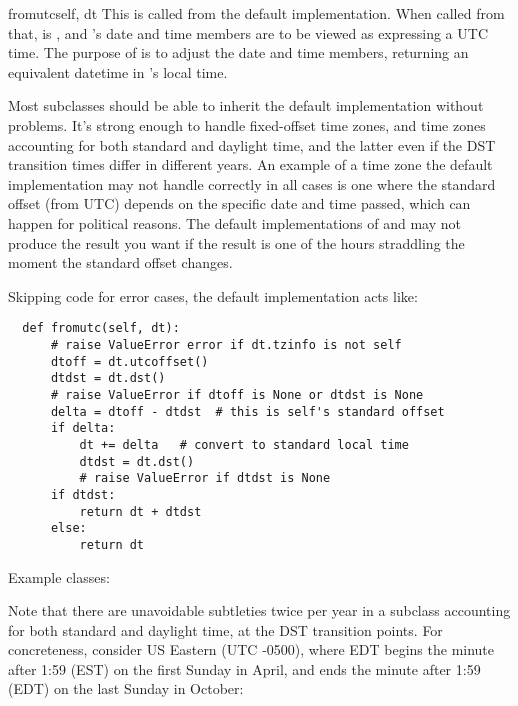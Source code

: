 \begin{methoddesc}[tzinfo]{fromutc}{self, dt}
  This is called from the default 
  implementation.  When called from that,  is
  , and 's date and time members are to be viewed as
  expressing a UTC time.  The purpose of  is to
  adjust the date and time members, returning an equivalent datetime in
  's local time.

  Most  subclasses should be able to inherit the default
   implementation without problems.  It's strong enough
  to handle fixed-offset time zones, and time zones accounting for both
  standard and daylight time, and the latter even if the DST transition
  times differ in different years.  An example of a time zone the default
   implementation may not handle correctly in all cases
  is one where the standard offset (from UTC) depends on the specific date
  and time passed, which can happen for political reasons.
  The default implementations of  and
   may not produce the result you want if the result is
  one of the hours straddling the moment the standard offset changes.

  Skipping code for error cases, the default 
  implementation acts like:

  \begin{verbatim}
  def fromutc(self, dt):
      # raise ValueError error if dt.tzinfo is not self
      dtoff = dt.utcoffset()
      dtdst = dt.dst()
      # raise ValueError if dtoff is None or dtdst is None
      delta = dtoff - dtdst  # this is self's standard offset
      if delta:
          dt += delta   # convert to standard local time
          dtdst = dt.dst()
          # raise ValueError if dtdst is None
      if dtdst:
          return dt + dtdst
      else:
          return dt
  \end{verbatim}
\end{methoddesc}

Example  classes:



Note that there are unavoidable subtleties twice per year in a
subclass accounting for both standard and daylight time, at the DST
transition points.  For concreteness, consider US Eastern (UTC -0500),
where EDT begins the minute after 1:59 (EST) on the first Sunday in
April, and ends the minute after 1:59 (EDT) on the last Sunday in October:

